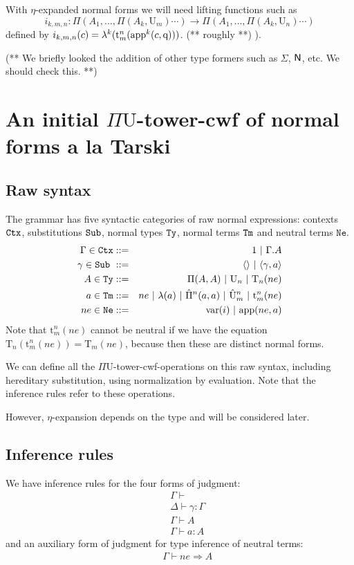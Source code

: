 \documentclass{lmcs}
\def\UU{\mathrm{U}}
\def\Ta{\mathrm{T}}
\def\Pihat{\hat{\Pi}}
\def\UUhat{\hat{\UU}}
\def\t{\mathrm{t}}
\def\RawNe{\texttt{Ne}}
\def\var{\mathrm{var}}
\def\q{\mathrm{q}}
\begin{document}
With $\eta$-expanded normal forms we will need lifting functions such as
$$
i_{k,m,n} : \Pi(A_1,\ldots, \Pi(A_k,\UU_m)\cdots)\to \Pi(A_1,\ldots, \Pi(A_k,\UU_n)\cdots)
$$
defined by $i_{k,m,n}(c)  = \lambda^k(\t^n_m(\ap^k(c,\q)))$. (** roughly **) ).

(** We briefly looked the addition of other type formers such as $\Sigma$, $\mathsf{N}$, etc. We should check this. **)

\section{An initial $\Pi\UU$-tower-cwf of normal forms a la Tarski}
\label{sec:syntax}


\subsection{Raw syntax}\label{sec:grammar}

The grammar has five syntactic categories of raw normal expressions: contexts ${\tt Ctx}$,
substitutions ${\tt Sub}$, normal types ${\tt Ty}$, normal terms ${\tt Tm}$ and neutral terms $\RawNe$.
\begin{eqnarray*}
\Gamma \in \RawCtx &::=& 1  \ |\ \Gamma.A\\
\gamma \in \RawSub \ &::=&  \langle\rangle \ |\ \langle \gamma, a \rangle\\
A \in \RawTy &::=& \Pi(A,A)\ |\  \UU_{n} \ |\ \Ta_n(ne) \\ 
a \in \RawTm &::=& ne \ |\  \lambda(a)\ |\ \Pihat^n(a,a)\ |\ \UUhat^n_m \ |\  \t^n_m(ne) \\
ne \in \RawNe &::=& \var(i)  \ |\  \ap(ne,a)
\end{eqnarray*}
Note that $\t^n_m(ne)$ cannot be neutral if we have the equation $\Ta_{n}(\t^n_m(ne)) = \Ta_m(ne)$, because then these are distinct normal forms.

We can define all the $\Pi\UU$-tower-cwf-operations on this raw syntax, including hereditary substitution, using normalization by evaluation. Note that the inference rules refer to these operations.

However, $\eta$-expansion depends on the type and will be considered later.

\subsection{Inference rules}
We have inference rules for the four forms of judgment:
\begin{eqnarray*}
&&\Gamma \vdash\\
&&\Delta \vdash \gamma : \Gamma\\
&&\Gamma \vdash A\\
&&\Gamma \vdash a : A
\end{eqnarray*}
and an auxiliary form of judgment for type inference of neutral terms:
\begin{eqnarray*}
&&\Gamma \vdash ne \Rightarrow A
\end{eqnarray*}
\end{document}
